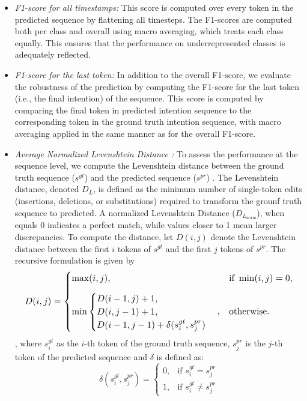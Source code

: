 \begin{itemize}
    \item \textit{F1-score for all timestamps:} This score is computed over every token in the predicted sequence by flattening all timesteps. The F1-scores are computed both per class and overall using macro averaging, which treats each class equally. This ensures that the performance on underrepresented classes is adequately reflected.

    \item \textit{F1-score for the last token:} In addition to the overall F1-score, we evaluate the robustness of the prediction by computing the F1-score for the last token (i.e., the final intention) of the sequence. This score is computed by comparing the final token in  predicted intention sequence to the corresponding token in the ground truth intention sequence, with macro averaging applied in the same manner as for the overall F1-score.

    \item \textit{Average Normalized Levenshtein Distance \cite{4160958}:} To assess the performance at the sequence level, we compute the Levenshtein distance between the ground truth sequence (\( s^{gt} \)) and the predicted sequence (\( s^{pr} \)) . The Levenshtein distance, denoted \( D_L \), is defined as the minimum number of single-token edits (insertions, deletions, or substitutions) required to transform the grounf truth sequence to predicted. A normalized Levenshtein Distance ($D_{L_{\text{norm}}}$), when equals 0 indicates a perfect match, while values closer to 1 mean larger discrepancies. To compute the distance, let \( D(i, j) \) denote the Levenshtein distance between the first \( i \) tokens of \( s^{gt} \) and the first \( j \) tokens of \( s^{pr} \). The recursive formulation is given by
    \begin{equation*}
        \resizebox{0.93\columnwidth}{!}{$
        D(i, j) =
        \begin{cases}
            \max(i, j), & \text{if } \min(i, j) = 0, \\[8pt]
            \min \begin{cases}
                D(i-1, j) + 1, \\
                D(i, j-1) + 1, \\
                D(i-1, j-1) + \delta(s^{gt}_i, s^{pr}_j)
            \end{cases}, & \text{otherwise}.
        \end{cases}
            $}
    \end{equation*}, where \( s^{gt}_i \) as the \( i \)-th token of the ground truth sequence, \( s^{pr}_j \) is the \( j \)-th token of the predicted sequence and $\delta$ is defined as:  
    \begin{equation*}
        \delta(s^{gt}_i, s^{pr}_j) =
        \begin{cases}
            0, & \text{if } s^{gt}_i = s^{pr}_j \\
            1, & \text{if } s^{gt}_i \neq s^{pr}_j
        \end{cases}
    \end{equation*}
    

\end{itemize}
